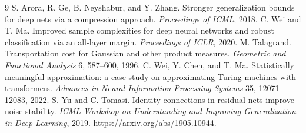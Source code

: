 \documentclass[11pt]{article}
\begin{document}









\clearpage
\appendix







\begin{thebibliography}{9}
S. Arora, R. Ge, B. Neyshabur, and Y. Zhang.
Stronger generalization bounds for deep nets via a compression approach.
\emph{Proceedings of ICML}, 2018.
C. Wei and T. Ma.
Improved sample complexities for deep neural networks and robust classification
via an all-layer margin. \emph{Proceedings of ICLR}, 2020.
M. Talagrand. Transportation cost for Gaussian and other product measures.
\emph{Geometric and Functional Analysis} 6, 587--600, 1996.
C. Wei, Y. Chen, and T. Ma.
Statistically meaningful approximation: a case study on approximating
Turing machines with transformers.
\emph{Advances in Neural Information Processing Systems} 35,
12071--12083, 2022.
S. Yu and C. Tomasi.
Identity connections in residual nets improve noise stability.
\emph{ICML Workshop on Understanding and Improving Generalization
in Deep Learning}, 2019.
\url{https://arxiv.org/abs/1905.10944}.
\end{thebibliography}
\end{document}
